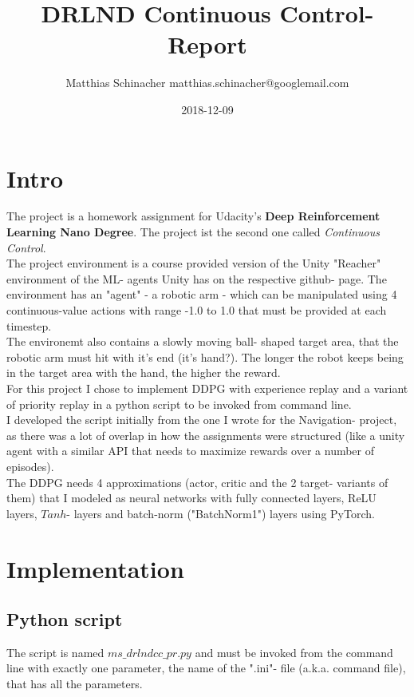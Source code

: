 \documentclass[a4paper]{article}
\title{DRLND Continuous Control- Report}
\date{2018-12-09}
\author{Matthias Schinacher matthias.schinacher@googlemail.com}
\begin{document}
\maketitle
\tableofcontents
\newpage

\section{Intro}
The project is a homework assignment for Udacity's \textbf{Deep Reinforcement Learning Nano Degree}.
The project ist the second one called \textit{Continuous Control}.
\\
The project environment is a course provided version of the Unity "Reacher"
environment of the ML- agents Unity has on the respective github- page.
The environment has an "agent" - a robotic arm - which can be manipulated
using 4 continuous-value actions with range -1.0 to 1.0 that must be provided
at each timestep.
\\
The environemt also contains a slowly moving ball- shaped target area,
that the robotic arm must hit with it's end (it's hand?).
The longer the robot keeps being in the target area with the hand,
the higher the reward.
\\
For this project I chose to implement DDPG with experience replay and
a variant of priority replay in a python script to be invoked from command line.
\\
I developed the script initially from the one I wrote for the Navigation- project,
as there was a lot of overlap in how the assignments were structured (like
a unity agent with a similar API that needs to maximize rewards over a
number of episodes).
\\
The DDPG needs 4 approximations (actor, critic and the 2 target- variants of them)
that I modeled as neural networks with fully connected layers, ReLU layers,
$Tanh$- layers and batch-norm ("BatchNorm1") layers using PyTorch.

\section{Implementation}
\subsection{Python script}
The script is named $ms\_drlndcc\_pr.py$ and must be invoked from the command
line with exactly one parameter, the name of the ".ini"- file (a.k.a. command file),
that has all the parameters.
\end{document}
